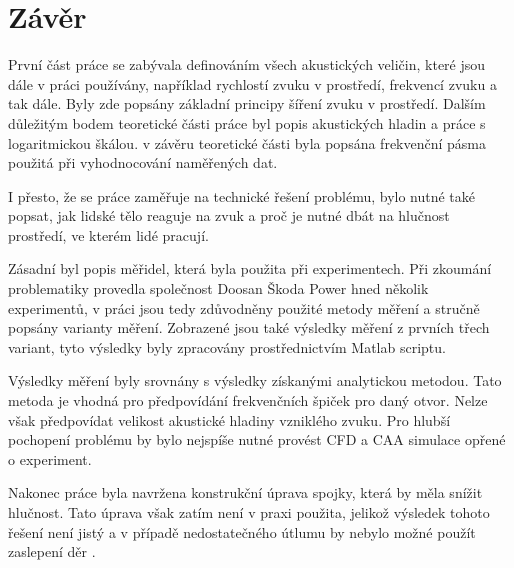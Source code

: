 \chapter*{Závěr}

První část práce se zabývala definováním všech akustických veličin, které jsou dále v práci používány, například rychlostí zvuku v prostředí, frekvencí zvuku a tak dále. Byly zde popsány základní principy šíření zvuku v prostředí. Dalším důležitým bodem teoretické části práce byl popis akustických hladin a práce s logaritmickou škálou. v závěru teoretické části byla popsána frekvenční pásma použitá při vyhodnocování naměřených dat.
\par I přesto, že se práce zaměřuje na technické řešení problému, bylo nutné také popsat, jak lidské tělo reaguje na zvuk a proč je nutné dbát na hlučnost prostředí, ve kterém lidé pracují. 
\par Zásadní byl popis měřidel, která byla použita při experimentech. Při zkoumání problematiky provedla společnost Doosan Škoda Power hned několik experimentů, v práci jsou tedy zdůvodněny použité metody měření a stručně popsány varianty měření. Zobrazené jsou také výsledky měření z prvních třech variant, tyto výsledky byly zpracovány prostřednictvím Matlab scriptu.
\par Výsledky měření byly srovnány s výsledky získanými analytickou metodou. Tato metoda je vhodná pro předpovídání frekvenčních špiček pro daný otvor. Nelze však předpovídat velikost akustické hladiny vzniklého zvuku. Pro hlubší pochopení problému by bylo nejspíše nutné provést CFD a CAA simulace opřené o experiment.
\par Nakonec práce byla navržena konstrukční úprava spojky, která by měla snížit hlučnost. Tato úprava však zatím není v praxi použita, jelikož výsledek tohoto řešení není jistý a v případě nedostatečného útlumu by nebylo možné použít zaslepení děr \cite{bartel_possible_2021}. 